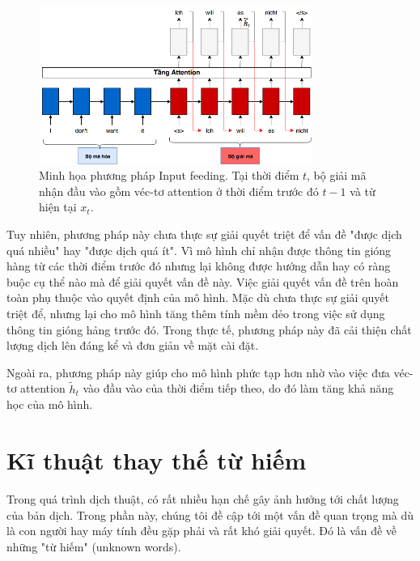 \begin{figure}
	\centering
	\includegraphics[width=0.8\textwidth]{Input-feeding_2.png}
	\caption[Minh họa cơ chế Attention Cục bộ.]{Minh họa phương pháp Input feeding. Tại thời điểm $t$, bộ giải mã nhận đầu vào gồm véc-tơ attention ở thời điểm trước đó $t-1$ và từ hiện tại $x_t$.}
	\label{fig_Input_feeding}
\end{figure}
Tuy nhiên, phương pháp này chưa thực sự giải quyết triệt để vấn đề "được dịch quá nhiều" hay "được dịch quá ít". Vì mô hình chỉ nhận được thông tin gióng hàng từ các thời điểm trước đó nhưng lại không được hướng dẫn hay có ràng buộc cụ thể nào mà để giải quyết vấn đề này. Việc giải quyết vấn đề trên hoàn toàn phụ thuộc vào quyết định của mô hình. Mặc dù chưa thực sự giải quyết triệt để, nhưng lại cho mô hình tăng thêm tính mềm dẻo trong việc sử dụng thông tin gióng hảng trước đó. Trong thực tế, phương pháp này đã cải thiện chất lượng dịch lên đáng kể và đơn giản về mặt cài đặt.

Ngoài ra, phương pháp này giúp cho mô hình phức tạp hơn nhờ vào việc đưa véc-tơ attention $\tilde{h}_{t}$ vào đầu vào của thời điểm tiếp theo, do đó làm tăng khả năng học của mô hình.

\section{Kĩ thuật thay thế từ hiếm}
Trong quá trình dịch thuật, có rất nhiều hạn chế gây ảnh hưởng tới chất lượng của bản dịch. Trong phần này, chúng tôi đề cập tới một vấn đề quan trọng mà dù là con người hay máy tính đều gặp phải và rất khó giải quyết. Đó là vấn đề về những "từ hiếm" (unknown words). 

